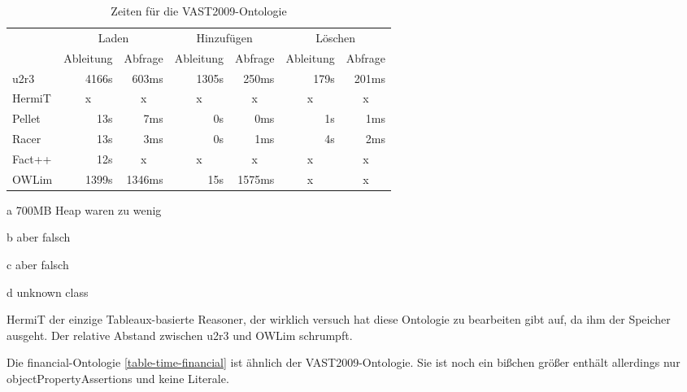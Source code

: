 \begin{table}[htbp]
\caption{Zeiten für die VAST2009-Ontologie}
\label{table-time-vast2009}
\begin{center}
\begin{threeparttable}
\begin{tabular}{l|r|r|r|r|r|r|}
\cline{2-7}
 & \multicolumn{2}{|c|}{Laden} & \multicolumn{2}{|c|}{Hinzufügen} & \multicolumn{2}{|c|}{Löschen} \\
\cline{2-7}
 & \multicolumn{1}{|c|}{Ableitung} & \multicolumn{1}{|c|}{Abfrage} & \multicolumn{1}{|c|}{Ableitung} & \multicolumn{1}{|c|}{Abfrage} & \multicolumn{1}{|c|}{Ableitung} & \multicolumn{1}{|c|}{Abfrage} \\
\hline
\multicolumn{1}{|l|}{u2r3} & 4166s & 603ms & 1305s & 250ms & 179s & 201ms \\ \hline
\multicolumn{1}{|l|}{HermiT\tnote{a}} & \multicolumn{1}{c|}{x} & \multicolumn{1}{c|}{x} & \multicolumn{1}{c|}{x} & \multicolumn{1}{c|}{x} & \multicolumn{1}{c|}{x} & \multicolumn{1}{c|}{x} \\ \hline
\multicolumn{1}{|l|}{Pellet\tnote{b}} & 13s & 7ms & 0s & 0ms & 1s & 1ms \\ \hline
\multicolumn{1}{|l|}{Racer\tnote{c}} & 13s & 3ms & 0s & 1ms & 4s & 2ms \\ \hline
\multicolumn{1}{|l|}{Fact++\tnote{c}} & 12s & \multicolumn{1}{c|}{x} & \multicolumn{1}{c|}{x} & \multicolumn{1}{c|}{x} & \multicolumn{1}{c|}{x} & \multicolumn{1}{c|}{x} \\ \hline
\multicolumn{1}{|l|}{OWLim} & 1399s & 1346ms & 15s & 1575ms & \multicolumn{1}{c|}{x} & \multicolumn{1}{c|}{x} \\ \hline
\end{tabular}
\begin{tablenotes}
	\item[a] 700MB Heap waren zu wenig
	\item[b] aber falsch
	\item[c] aber falsch
	\item[d] unknown class
\end{tablenotes}
\end{threeparttable}
\end{center}
\end{table}

HermiT der einzige Tableaux-basierte Reasoner, der wirklich versuch hat diese Ontologie zu bearbeiten gibt auf, da ihm der Speicher ausgeht. Der relative Abstand zwischen u2r3 und OWLim schrumpft.

Die financial-Ontologie \ref{table-time-financial} ist ähnlich der VAST2009-Ontologie. Sie ist noch ein bißchen größer enthält allerdings nur objectPropertyAssertions und keine Literale.

